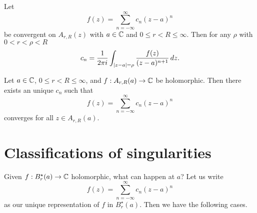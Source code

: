 
\begin{proposition}[]
    Let
    \[
        f(z) = \sum^{\infty}_{n=-\infty} c_n(z-a)^n
    \]
    be convergent on $A_{r,R}(z)$ with $a \in \mathbb{C}$ and
    $0 \leq r < R \leq \infty$.
    Then for any $\rho$ with $0 < r < \rho < R$
    \[
        c_n = \frac1{2\pi i} \int_{\left\lvert z-a\right\rvert=\rho} \frac{f(z)}{(z-a)^{n+1}} \,dz.
    \]
\end{proposition}

\begin{theorem}[Laurent's]
    Let $a \in \mathbb{C}$, $0 \leq r < R \leq \infty$, and
    $f: A_{r,R}(a) \to \mathbb{C}$ be holomorphic.
    Then there exists an unique $c_n$ such that
    \[
        f(z) = \sum^{\infty}_{n = -\infty} c_n (z-a)^n
    \]
    converges for all $z \in A_{r,R}(a)$.
\end{theorem}

\section{Classifications of singularities}

Given $f: B_r^\star(a) \to \mathbb{C}$ holomorphic, what can happen at $a$?
Let us write
\[
    f(z) = \sum_{n=-\infty}^\infty c_n(z-a)^n
\]
as our unique representation of $f$ in $B_r^\star(a)$.
Then we have the following cases.

